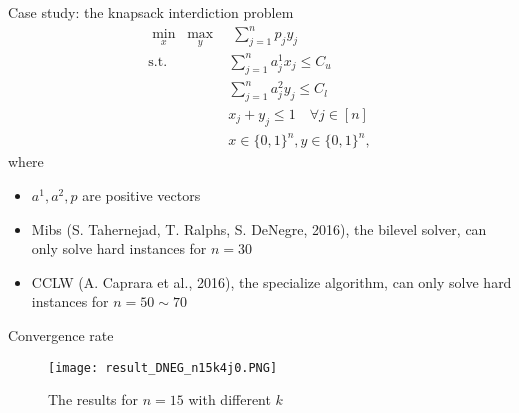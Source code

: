 \documentclass{beamer}
\begin{document}
\begin{frame}{Case study: the knapsack interdiction problem} \small
	\begin{align*}
	 \min_x \; \max_y& \; \sum_{j=1}^n p_jy_j  \\
	\text{s.t.~~}& \sum_{j=1}^n a^1_j x_j \leq C_u \\
	& \sum_{j=1}^n a^2_jy_j \leq C_l\\
	& x_j + y_j \leq 1 \quad \forall j\in [n]  \\
	& x \in \{0, 1\}^n, y\in \{0,1\}^n, 
	\end{align*}
	where 
	\begin{itemize}
		\item $a^1, a^2, p$ are positive vectors
		\item Mibs (S. Tahernejad, T. Ralphs, S. DeNegre, 2016), the bilevel solver, can only solve hard instances for $n=30$
		\item CCLW (A. Caprara et al., 2016), the specialize algorithm, can only solve hard instances for $n=50 \sim 70$
	\end{itemize}
\end{frame}

\begin{frame}{Convergence rate}
	\begin{figure}
		\centering
		\texttt{[image: result\_DNEG\_n15k4j0.PNG]}
		\caption{The results for $n=15$ with different $k$}
		\label{fig:n15k4j0}
	\end{figure}
\end{frame}
\end{document}
